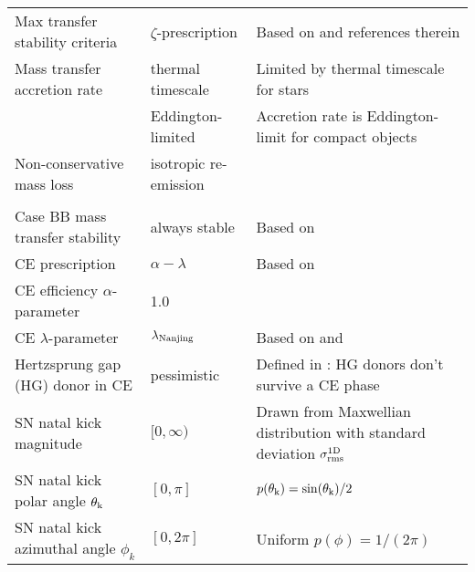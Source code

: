 \documentclass[twocolumn]{aastex631}
\begin{document}
\begin{table*}[ht!]
{\begin{tabular}{lll}
%
Max transfer stability criteria & $\zeta$-prescription & Based on \citet[][]{Vigna-Gomez_2018} and references therein     \\
%
Mass transfer accretion rate & thermal timescale & Limited by thermal timescale for stars  \citet[][]{Hurley_2002, Vinciguerra_2020} \\
 & Eddington-limited  & Accretion rate is Eddington-limit for compact objects  \\
%
Non-conservative mass loss & isotropic re-emission &  {\citet[][]{Massevitch_1975, Bhattacharya_1991, Soberman_1997}} \\
& &  {\citet{Tauris_2006}} \\
%
Case BB mass transfer stability                                														& always stable         &       Based on  \citet{Tauris_2015, Tauris_2017, Vigna-Gomez_2018}         \\
%
%
CE prescription & $\alpha-\lambda$ & Based on  \citet{Webbink_1984, deKool_1990}  \\
%
CE efficiency $\alpha$-parameter                     												& 1.0                               &              \\
%
CE $\lambda$-parameter                               													& $\lambda_{\rm{Nanjing}}$                             &        Based on \citet{Xu_2010a, Xu_2010b} and  \citet{Dominik_2012}       \\
%
Hertzsprung gap (HG) donor in {CE}                       														& pessimistic                       &  Defined in \citet{Dominik_2012}:  HG donors don't survive a {CE}  phase        \\
%
%
{SN} natal kick magnitude \vk                          									& $[0, \infty)$\kms & Drawn from Maxwellian distribution with standard deviation $\sigma_{\rm{rms}}^{\rm{1D}}$          \\
%
 {SN} natal kick polar angle ${\theta}_{\rm{k}}$          											& $[0, \pi]$                        & $p({\theta}_{\rm{k}}) = \sin({\theta}_{\rm{k}})/2$ \\
%
 {SN} natal kick azimuthal angle $\phi_k$                           					  	& $[0, 2\pi]$                        & Uniform $p(\phi) = 1/ (2 \pi)$   \\

\end{tabular}}
\end{table*}
\end{document}
